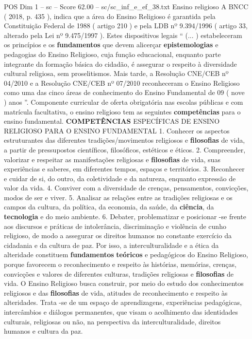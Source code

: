 \begin{textsample}{POS Dim 1 – sc – Score 62.00 – sc/sc\_inf\_e\_ef\_38.txt}  \label{ex:f1_pos_016}
Ensino religioso A BNCC ( 2018, p. 435 ), indica que a área do Ensino Religioso é garantida pela Constituição Federal de 1988 ( artigo 210 ) e pela LDB nº 9.394/1996 ( artigo 33, alterado pela Lei nº 9.475/1997 ).
Estes dispositivos legais “ (... ) estabeleceram os princípios e os \textbf{fundamentos} que devem alicerçar \textbf{epistemologias} e pedagogias do Ensino Religioso, cuja função educacional, enquanto parte integrante da formação básica do cidadão, é assegurar o respeito à diversidade cultural religiosa, sem proselitismos.
Mais tarde, a Resolução CNE/CEB nº 04/2010 e a Resolução CNE/CEB nº 07/2010 reconheceram o Ensino Religioso como uma das cinco áreas de conhecimento do Ensino Fundamental de 09 ( nove ) anos ”.
Componente curricular de oferta obrigatória nas escolas públicas e com matrícula facultativa, o ensino religioso tem as seguintes \textbf{competências} para o ensino fundamental. \textbf{COMPETÊNCIAS} ESPECÍFICAS DE ENSINO RELIGIOSO PARA O ENSINO FUNDAMENTAL 1.
Conhecer os aspectos estruturantes das diferentes tradições/movimentos religiosos e \textbf{filosofias} de vida, a partir de pressupostos científicos, filosóficos, estéticos e éticos. 2.
Compreender, valorizar e respeitar as manifestações religiosas e \textbf{filosofias} de vida, suas experiências e saberes, em diferentes tempos, espaços e territórios. 3.
Reconhecer e cuidar de si, do outro, da coletividade e da natureza, enquanto expressão de valor da vida. 4.
Conviver com a diversidade de crenças, pensamentos, convicções, modos de ser e viver. 5.
Analisar as relações entre as tradições religiosas e os campos da cultura, da política, da economia, da saúde, da \textbf{ciência}, da \textbf{tecnologia} e do meio ambiente. 6.
Debater, problematizar e posicionar -se frente aos discursos e práticas de intolerância, discriminação e violência de cunho religioso, de modo a assegurar os direitos humanos no constante exercício da cidadania e da cultura de paz.
Por isso, a interculturalidade e a ética da alteridade constituem \textbf{fundamentos} \textbf{teóricos} e pedagógicos do Ensino Religioso, porque favorecem o reconhecimento e respeito às histórias, memórias, crenças, convicções e valores de diferentes culturas, tradições religiosas e \textbf{filosofias} de vida.
O Ensino Religioso busca construir, por meio do estudo dos conhecimentos religiosos e das \textbf{filosofias} de vida, atitudes de reconhecimento e respeito às alteridades.
Trata -se de um espaço de aprendizagens, experiências pedagógicas, intercâmbios e diálogos permanentes, que visam o acolhimento das identidades culturais, religiosas ou não, na perspectiva da interculturalidade, direitos humanos e cultura da paz.

\end{textsample}
